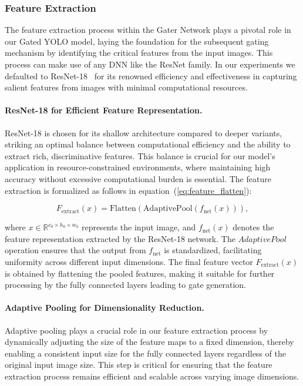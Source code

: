 \subsubsection{Feature Extraction}

The feature extraction process within the Gater Network plays a pivotal role in our Gated YOLO model, laying the foundation for the subsequent gating mechanism by identifying the critical features from the input images. This process can make use of any DNN like the ResNet family. In our experiments we defaulted to ResNet-18~\cite{he2016deep} for its renowned efficiency and effectiveness in capturing salient features from images with minimal computational resources.

\paragraph{ResNet-18 for Efficient Feature Representation.} ResNet-18 is chosen for its shallow architecture compared to deeper variants, striking an optimal balance between computational efficiency and the ability to extract rich, discriminative features. This balance is crucial for our model's application in resource-constrained environments, where maintaining high accuracy without excessive computational burden is essential. The feature extraction is formalized as follows in equation~(\ref{eq:feature_flatten}):

\begin{equation}
    F_{\text{extract}}(x) = \text{Flatten}(\text{AdaptivePool}(f_{\text{net}}(x))),
    \label{eq:feature_flatten}
\end{equation}

\noindent{}where \(x \in \mathbb{R}^{c_0 \times h_0 \times w_0}\) represents the input image, and \(f_{\text{net}}(x)\) denotes the feature representation extracted by the ResNet-18 network. The \(AdaptivePool\) operation ensures that the output from \(f_{\text{net}}\) is standardized, facilitating uniformity across different input dimensions. The final feature vector \(F_{\text{extract}}(x)\) is obtained by flattening the pooled features, making it suitable for further processing by the fully connected layers leading to gate generation.

\paragraph{Adaptive Pooling for Dimensionality Reduction.} Adaptive pooling plays a crucial role in our feature extraction process by dynamically adjusting the size of the feature maps to a fixed dimension, thereby enabling a consistent input size for the fully connected layers regardless of the original input image size. This step is critical for ensuring that the feature extraction process remains efficient and scalable across varying image dimensions.

